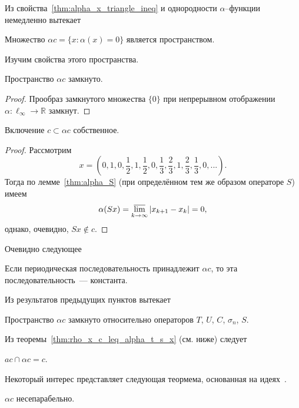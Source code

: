 Из свойства~\ref{thm:alpha_x_triangle_ineq} и однородности $\alpha$--функции немедленно вытекает
\begin{theorem}
	Множество $\alpha c = \{x: \alpha(x) = 0\}$
	является пространством.
\end{theorem}
Изучим свойства этого пространства.
\begin{property}
	Пространство $\alpha c$ замкнуто.
\end{property}
\begin{proof}
	Прообраз замкнутого множества $\{0\}$
	при непрерывном отображении $\alpha : \ell_\infty \to \mathbb{R}$
	замкнут.
\end{proof}
\begin{theorem}
	Включение $c \subset \alpha c$ собственное.
\end{theorem}
\begin{proof}
	Рассмотрим
	\begin{equation}
		x=\left(
			0,1,
			0,\frac{1}{2},1,\frac{1}{2},
			0,\frac{1}{3},\frac{2}{3},1,\frac{2}{3},\frac{1}{3},
			0,
			...
		\right)
		.
	\end{equation}
	Тогда по лемме~\ref{thm:alpha_S} (при определённом тем же образом операторе $S$) имеем
	\begin{equation}
		\alpha(Sx) = \varlimsup_{k\to\infty} |x_{k+1} - x_{k}| = 0
		,
	\end{equation}
	однако, очевидно, $Sx\notin c$.
\end{proof}
Очевидно следующее
\begin{property}
	Если периодическая последовательность принадлежит $\alpha c$,
	то эта последовательность~--- константа.
\end{property}

Из результатов предыдущих пунктов вытекает
\begin{theorem}
	Пространство $\alpha c$ замкнуто относительно операторов $T$, $U$, $C$, $\sigma_n$, $S$.
\end{theorem}

Из теоремы~\ref{thm:rho_x_c_leq_alpha_t_s_x} (см. ниже) следует
\begin{theorem}
	$ac \cap\alpha c = c$.
\end{theorem}

Некоторый интерес представляет следующая теормема,
основанная на идеях~\cite{usachev2009_phd_vsu}.

\begin{theorem}
	$\alpha c$ несепарабельно.
\end{theorem}

